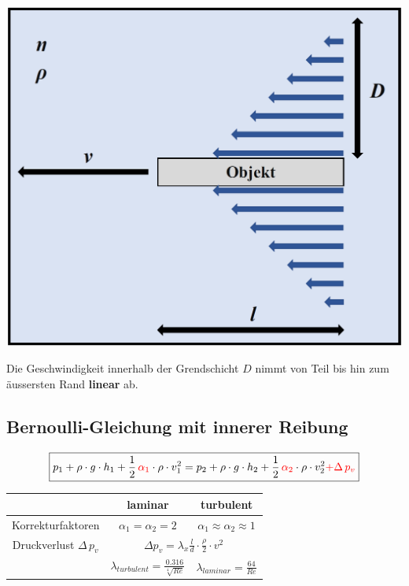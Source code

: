 \begin{minipage}{0.48\linewidth}
\includegraphics[width=0.8\linewidth]{Bilder/prandl}
\end{minipage}
\hfill
\begin{minipage}{0.48\linewidth}
Die Geschwindigkeit innerhalb der Grendschicht $D$ nimmt von Teil bis hin zum äussersten Rand \textbf{linear} ab.
\end{minipage}


\vfill\null
\columnbreak




\subsection{Bernoulli-Gleichung mit innerer Reibung}

$$ \boxed{  p_1 +  \rho \cdot g \cdot h_1 + \frac{1}{2} \, \textcolor{red}{\alpha_1} \cdot \rho \cdot v_1^2 = p_2 +  \rho \cdot g \cdot h_2 + \frac{1}{2} \, \textcolor{red}{\alpha_2} \cdot \rho \cdot v_2^2 \textcolor{red}{+ \Delta \, p_v}  }$$

\begin{tabular}{c| c |c}
 & laminar & turbulent \\ 
\hline 
Korrekturfaktoren & $\alpha_1 = \alpha_2 = 2$  & $\alpha_1 \approx \alpha_2 \approx 1$ \\ 
\hline 
\rule{0pt}{11pt} Druckverlust $\Delta \, p_v$ & \multicolumn{2}{c}{$\Delta p_v = \lambda_x \frac{l}{d} \cdot \frac{\rho}{2} \cdot v^2$} \\ 
\hline 
\rule{0pt}{11pt}  & $\lambda_{turbulent} = \frac{0.316}{\sqrt[4]{Re}}  $ & $\lambda_{laminar} = \frac{64}{Re} $  \\ 
\end{tabular} 



